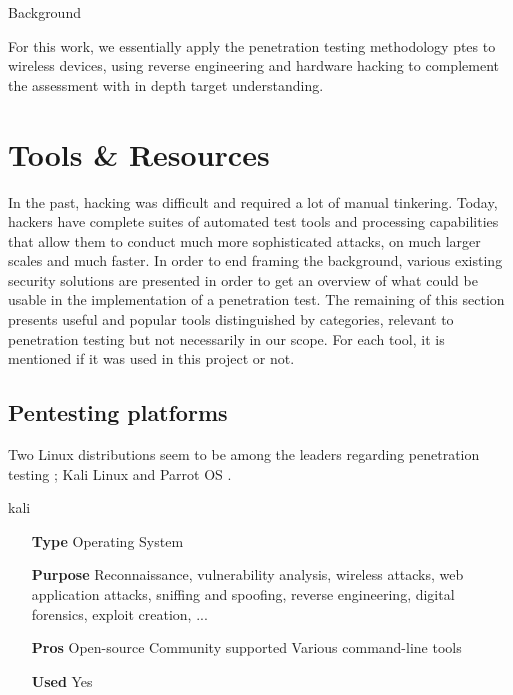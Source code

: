 \begin{chaptercover}{Background}
\begin{info}
For this work, we essentially apply the penetration testing methodology \acrshort{ptes} to wireless devices, using reverse engineering and hardware hacking to complement the assessment with in depth target understanding.
\end{info}


\section{Tools \& Resources}

In the past, hacking was difficult and required a lot of manual tinkering. Today, hackers have complete suites of automated test tools and processing capabilities that allow them to conduct much more sophisticated attacks, on much larger scales and much faster. In order to end framing the background, various existing security solutions are presented in order to get an overview of what could be usable in the implementation of a penetration test. The remaining of this section presents useful and popular tools distinguished by categories, relevant to penetration testing but not necessarily in our scope. For each tool, it is mentioned if it was used in this project or not.

\subsection{Pentesting platforms}

Two Linux distributions seem to be among the leaders regarding penetration testing ; Kali Linux \cite{kali-linux} and Parrot OS \cite{parrot-os}.

\begin{solutiondata}{kali}
\begin{itemize}[labelsep=1cm]
  \item [\textbf{Type}] Operating System
  \item [\textbf{Purpose}] Reconnaissance, vulnerability analysis, wireless attacks, web application attacks, sniffing and spoofing, reverse engineering, digital forensics, exploit creation, ...
  \item [\textbf{Pros}] Open-source \newline Community supported \newline Various command-line tools
  \item [\textbf{Used}] Yes
\end{itemize}
\end{solutiondata}


\end{chaptercover}
